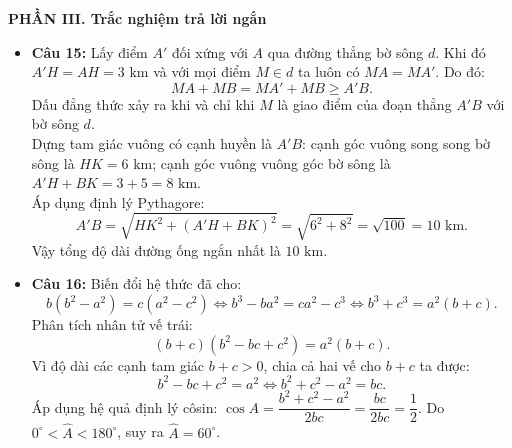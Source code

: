 \documentclass[12pt,a4paper]{article}
\begin{document}
\vspace{0.15cm}
\textbf{PHẦN III. Trắc nghiệm trả lời ngắn}
\begin{itemize}[leftmargin=0.6cm, itemsep=1.5pt, topsep=1pt]
    \item \textbf{Câu 15:} Lấy điểm $A'$ đối xứng với $A$ qua đường thẳng bờ sông $d$.
    Khi đó $A'H = AH = 3\text{ km}$ và với mọi điểm $M \in d$ ta luôn có $MA = MA'$.
    Do đó:
    \[
    MA + MB = MA' + MB \ge A'B.
    \]
    Dấu đẳng thức xảy ra khi và chỉ khi $M$ là giao điểm của đoạn thẳng $A'B$ với bờ sông $d$.\\
    Dựng tam giác vuông có cạnh huyền là $A'B$: cạnh góc vuông song song bờ sông là $HK = 6\text{ km}$; cạnh góc vuông vuông góc bờ sông là $A'H + BK = 3 + 5 = 8\text{ km}$.\\
    Áp dụng định lý Pythagore:
    \[
    A'B = \sqrt{HK^2 + (A'H + BK)^2} = \sqrt{6^2 + 8^2} = \sqrt{100} = 10\text{ km}.
    \]
    Vậy tổng độ dài đường ống ngắn nhất là $10\text{ km}$.

    \item \textbf{Câu 16:} Biến đổi hệ thức đã cho:
    \[
    b(b^2 - a^2) = c(a^2 - c^2) \iff b^3 - ba^2 = ca^2 - c^3 \iff b^3 + c^3 = a^2(b + c).
    \]
    Phân tích nhân tử vế trái:
    \[
    (b + c)(b^2 - bc + c^2) = a^2(b + c).
    \]
    Vì độ dài các cạnh tam giác $b + c > 0$, chia cả hai vế cho $b + c$ ta được:
    \[
    b^2 - bc + c^2 = a^2 \iff b^2 + c^2 - a^2 = bc.
    \]
    Áp dụng hệ quả định lý côsin:
    $\cos A = \dfrac{b^2 + c^2 - a^2}{2bc} = \dfrac{bc}{2bc} = \dfrac{1}{2}$.
    Do $0^\circ < \widehat{A} < 180^\circ$, suy ra $\widehat{A} = 60^\circ$.


\end{itemize}
\end{document}
